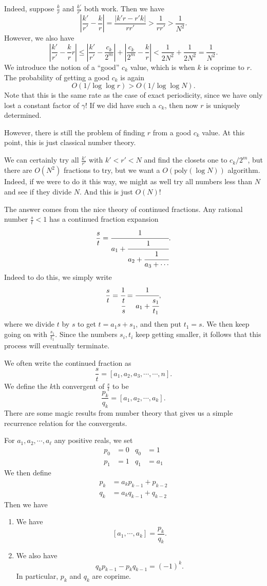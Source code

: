 \documentclass[a4paper]{article}
\begin{document}
Indeed, suppose $\frac{k}{r}$ and $\frac{k'}{r'}$ both work. Then we have
\[
  \left|\frac{k'}{r'} - \frac{k}{r}\right| = \frac{|k'r - r'k|}{rr'} > \frac{1}{rr'} > \frac{1}{N^2}.
\]
However, we also have
\[
  \left|\frac{k'}{r'} - \frac{k}{r}r\right| \leq \left|\frac{k'}{r'} - \frac{c_k}{2^m}\right| + \left|\frac{c_k}{2^m} - \frac{k}{r}\right| < \frac{1}{2N^2} + \frac{1}{2N^2} = \frac{1}{N^2}.
\]
We introduce the notion of a ``good'' $c_k$ value, which is when $k$ is coprime to $r$. The probability of getting a good $c_k$ is again
\[
  O(1/\log \log r) > O(1/\log \log N).
\]
Note that this is the same rate as the case of exact periodicity, since we have only lost a constant factor of $\gamma$! If we did have such a $c_k$, then now $r$ is uniquely determined.

However, there is still the problem of finding $r$ from a good $c_k$ value. At this point, this is just classical number theory.

We can certainly try all $\frac{k'}{r'}$ with $k' < r' < N$ and find the closets one to $c_k/2^m$, but there are $O(N^2)$ fractions to try, but we want a $O(\mathrm{poly}(\log N))$ algorithm. Indeed, if we were to do it this way, we might as well try all numbers less than $N$ and see if they divide $N$. And this is just $O(N)$!

The answer comes from the nice theory of continued fractions. Any rational number $\frac{s}{t} < 1$ has a continued fraction expansion
\[
  \frac{s}{t} = \cfrac{1}{a_1 + \cfrac{1}{a_2 + \cfrac{1}{a_3 + \cdots}}}.
\]
Indeed to do this, we simply write
\[
  \frac{s}{t} = \cfrac{1}{\cfrac{t}{s}} = \cfrac{1}{a_1 + \cfrac{s_1}{t_1}},
\]
where we divide $t$ by $s$ to get $t = a_1s + s_1$, and then put $t_1 = s$. We then keep going on with $\frac{s_1}{t_1}$. Since the numbers $s_i, t_i$ keep getting smaller, it follows that this process will eventually terminate.

We often write the continued fraction as
\[
  \frac{s}{t} = [a_1, a_2, a_3, \cdots, \cdots, n].
\]
We define the $k$th convergent of $\frac{s}{t}$ to be
\[
  \frac{p_k}{q_k} = [a_1, a_2, \cdots, a_k].
\]
There are some magic results from number theory that gives us a simple recurrence relation for the convergents.
\begin{lemma}
  For $a_1, a_2, \cdots, a_\ell$ any positive reals, we set
  \begin{align*}
    p_0 &= 0 & q_0 &= 1\\
    p_1 &= 1 & q_1 &= a_1
  \end{align*}
  We then define
  \begin{align*}
    p_k &= a_k p_{k - 1} + p_{k - 2}\\
    q_k &= a_k q_{k - 1} + q_{k - 2}
  \end{align*}
  Then we have
  \begin{enumerate}
    \item We have
      \[
        [a_1, \cdots, a_k] = \frac{p_k}{q_k}.
      \]
    \item We also have
      \[
        q_k p_{k - 1} - p_k q_{k - 1} = (-1)^k.
      \]
      In particular, $p_k$ and $q_k$ are coprime.
  \end{enumerate}
\end{lemma}
\end{document}
